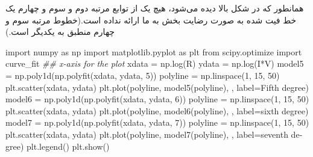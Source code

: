 \documentclass{article}
\newenvironment{Shaded}{}{}
\newcommand{\CommentTok}[1]{\textcolor[rgb]{0.38,0.63,0.69}{\textit{#1}}}
\newcommand{\DecValTok}[1]{\textcolor[rgb]{0.25,0.63,0.44}{#1}}
\newcommand{\ImportTok}[1]{#1}
\newcommand{\NormalTok}[1]{#1}
\newcommand{\OperatorTok}[1]{\textcolor[rgb]{0.40,0.40,0.40}{#1}}
\newcommand{\StringTok}[1]{\textcolor[rgb]{0.25,0.44,0.63}{#1}}
\begin{document}
\begin{latin}
\begin{center}
\end{center}
\end{latin}
همانطور که در شکل بالا دیده می‌شود، هیچ یک از توابع مرتبه دوم و سوم و چهارم یک خط فیت شده به صورت رضایت بخش به ما ارائه نداده است.(خطوط مرتبه سوم و چهارم منطبق به یکدیگر است.)
\begin{latin}
\begin{Shaded}
\begin{Highlighting}[]
\ImportTok{import}\NormalTok{ numpy }\ImportTok{as}\NormalTok{ np}
\ImportTok{import}\NormalTok{ matplotlib.pyplot }\ImportTok{as}\NormalTok{ plt}
\ImportTok{from}\NormalTok{ scipy.optimize }\ImportTok{import}\NormalTok{ curve\_fit}
\CommentTok{\#\# x{-}axis for the plot}
\NormalTok{xdata }\OperatorTok{=}\NormalTok{ np.log(R)}
\NormalTok{ydata }\OperatorTok{=}\NormalTok{ np.log(I}\OperatorTok{*}\NormalTok{V)}
\NormalTok{model5 }\OperatorTok{=}\NormalTok{ np.poly1d(np.polyfit(xdata, ydata, }\DecValTok{5}\NormalTok{))}
\NormalTok{polyline }\OperatorTok{=}\NormalTok{ np.linspace(}\DecValTok{1}\NormalTok{, }\DecValTok{15}\NormalTok{, }\DecValTok{50}\NormalTok{)}
\NormalTok{plt.scatter(xdata, ydata)}
\NormalTok{plt.plot(polyline, model5(polyline),  }\StringTok{\textquotesingle{}{-}\textquotesingle{}}\NormalTok{, label}\OperatorTok{=}\StringTok{\textquotesingle{}Fifth degree\textquotesingle{}}\NormalTok{)}
\NormalTok{model6 }\OperatorTok{=}\NormalTok{ np.poly1d(np.polyfit(xdata, ydata, }\DecValTok{6}\NormalTok{))}
\NormalTok{polyline }\OperatorTok{=}\NormalTok{ np.linspace(}\DecValTok{1}\NormalTok{, }\DecValTok{15}\NormalTok{, }\DecValTok{50}\NormalTok{)}
\NormalTok{plt.scatter(xdata, ydata)}
\NormalTok{plt.plot(polyline, model6(polyline),  }\StringTok{\textquotesingle{}{-}\textquotesingle{}}\NormalTok{, label}\OperatorTok{=}\StringTok{\textquotesingle{}sixth degree\textquotesingle{}}\NormalTok{)}
\NormalTok{model7 }\OperatorTok{=}\NormalTok{ np.poly1d(np.polyfit(xdata, ydata, }\DecValTok{7}\NormalTok{))}
\NormalTok{polyline }\OperatorTok{=}\NormalTok{ np.linspace(}\DecValTok{1}\NormalTok{, }\DecValTok{15}\NormalTok{, }\DecValTok{50}\NormalTok{)}
\NormalTok{plt.scatter(xdata, ydata)}
\NormalTok{plt.plot(polyline, model7(polyline),  }\StringTok{\textquotesingle{}{-}\textquotesingle{}}\NormalTok{, label}\OperatorTok{=}\StringTok{\textquotesingle{}seventh degree\textquotesingle{}}\NormalTok{)}
\NormalTok{plt.legend()}
\NormalTok{plt.show()}
\end{Highlighting}
\end{Shaded}

\end{latin}
\end{document}
